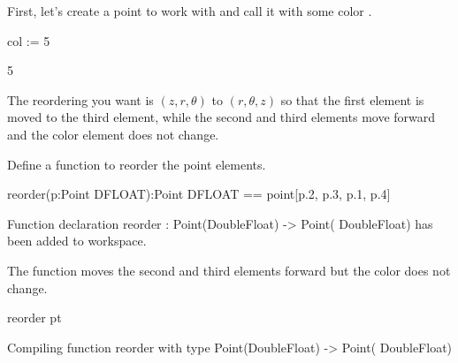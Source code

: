 \begin{xtc}
\begin{xtccomment}
First, let's create a point to
work with and call it  with some color .
\end{xtccomment}
\begin{spadsrc}
col := 5 
\end{spadsrc}
\begin{TeXOutput}
\begin{fricasmath}{4}
5%
\end{fricasmath}
\end{TeXOutput}
\end{xtc}
\begin{xtc}
\begin{xtccomment}
\end{xtccomment}
\begin{TeXOutput}
\begin{fricasmath}{5}
%
\end{fricasmath}
\end{TeXOutput}
\end{xtc}
The reordering you want is
$(z,r, \theta)$ to
$(r, \theta,z)$
so that the first element is moved to the third element, while the second
and third elements move forward and the color element does not change.
\begin{xtc}
\begin{xtccomment}
Define a function  to reorder the point elements.
\end{xtccomment}
\begin{spadsrc}
reorder(p:Point DFLOAT):Point DFLOAT == point[p.2, p.3, p.1, p.4] 
\end{spadsrc}
\begin{MessageOutput}
   Function declaration reorder : Point(DoubleFloat) -> Point(
      DoubleFloat) has been added to workspace.
\end{MessageOutput}
\end{xtc}
\begin{xtc}
\begin{xtccomment}
The function moves the second and third elements
forward but the color does not change.
\end{xtccomment}
\begin{spadsrc}
reorder pt 
\end{spadsrc}
\begin{MessageOutput}
   Compiling function reorder with type Point(DoubleFloat) -> Point(
      DoubleFloat) 
\end{MessageOutput}
\begin{TeXOutput}
\begin{fricasmath}{7}
%
\end{fricasmath}
\end{TeXOutput}
\end{xtc}
